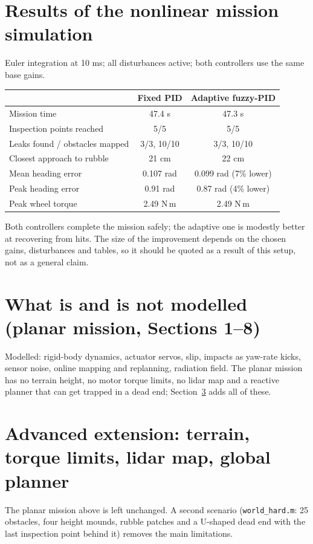 \documentclass[11pt,a4paper]{article}
\begin{document}
\section{Results of the nonlinear mission simulation}
Euler integration at 10 ms; all disturbances active; both controllers use the same base gains.
\begin{center}
\small
\begin{tabular}{@{}lcc@{}}
\toprule
 & Fixed PID & Adaptive fuzzy-PID\\
\midrule
Mission time & 47.4 s & 47.3 s\\
Inspection points reached & 5/5 & 5/5\\
Leaks found / obstacles mapped & 3/3, 10/10 & 3/3, 10/10\\
Closest approach to rubble & 21 cm & 22 cm\\
Mean heading error & 0.107 rad & 0.099 rad (7\% lower)\\
Peak heading error & 0.91 rad & 0.87 rad (4\% lower)\\
Peak wheel torque & 2.49 N\,m & 2.49 N\,m\\
\bottomrule
\end{tabular}
\end{center}
Both controllers complete the mission safely; the adaptive one is modestly better at recovering from hits. The size of the improvement depends on the chosen gains, disturbances and tables, so it should be quoted as a result of this setup, not as a general claim.

\section{What is and is not modelled (planar mission, Sections 1--8)}
Modelled: rigid-body dynamics, actuator servos, slip, impacts as yaw-rate kicks, sensor noise, online mapping and replanning, radiation field. The planar mission has no terrain height, no motor torque limits, no lidar map and a reactive planner that can get trapped in a dead end; Section~\ref{sec:adv} adds all of these.

\section{Advanced extension: terrain, torque limits, lidar map, global planner}\label{sec:adv}
The planar mission above is left unchanged. A second scenario (\texttt{world\_hard.m}: 25 obstacles, four height mounds, rubble patches and a U-shaped dead end with the last inspection point behind it) removes the main limitations.
\end{document}
